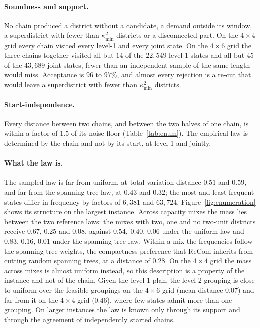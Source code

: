 \documentclass[11pt]{article}
\theoremstyle{definition}
\begin{document}
\paragraph{Soundness and support.}
No chain produced a district without a candidate, a demand outside its window, a superdistrict with fewer than $\kappa^2_{\min}$ districts or a disconnected part. On the $4\times4$ grid every chain visited every level-1 and every joint state. On the $4\times6$ grid the three chains together visited all but $14$ of the $22{,}549$ level-1 states and all but $45$ of the $43{,}689$ joint states, fewer than an independent sample of the same length would miss. Acceptance is $96$ to $97\%$, and almost every rejection is a re-cut that would leave a superdistrict with fewer than $\kappa^2_{\min}$ districts.

\paragraph{Start-independence.}
Every distance between two chains, and between the two halves of one chain, is within a factor of $1.5$ of its noise floor (Table~\ref{tab:enum}). The empirical law is determined by the chain and not by its start, at level 1 and jointly.

\paragraph{What the law is.}
The sampled law is far from uniform, at total-variation distance $0.51$ and $0.59$, and far from the spanning-tree law, at $0.43$ and $0.32$; the most and least frequent states differ in frequency by factors of $6{,}381$ and $63{,}724$. Figure~\ref{fig:enumeration} shows its structure on the largest instance. Across capacity mixes the mass lies between the two reference laws: the mixes with two, one and no two-unit districts receive $0.67$, $0.25$ and $0.08$, against $0.54$, $0.40$, $0.06$ under the uniform law and $0.83$, $0.16$, $0.01$ under the spanning-tree law. Within a mix the frequencies follow the spanning-tree weights, the compactness preference that ReCom inherits from cutting random spanning trees, at a distance of $0.28$. On the $4\times4$ grid the mass across mixes is almost uniform instead, so this description is a property of the instance and not of the chain. Given the level-1 plan, the level-2 grouping is close to uniform over the feasible groupings on the $4\times6$ grid (mean distance $0.07$) and far from it on the $4\times4$ grid ($0.46$), where few states admit more than one grouping. On larger instances the law is known only through its support and through the agreement of independently started chains.
\end{document}
